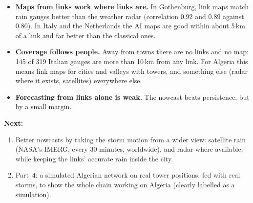 \begin{itemize}
\item \textbf{Maps from links work where links are.} In Gothenburg, link maps match rain gauges better than the weather
radar (correlation 0.92 and 0.89 against 0.80). In Italy and the Netherlands the AI maps are good within about 5\,km of a
link and far better than the classical ones.
\item \textbf{Coverage follows people.} Away from towns there are no links and no map: 145 of 319 Italian gauges are more
than 10\,km from any link. For Algeria this means link maps for cities and valleys with towers, and something else (radar
where it exists, satellites) everywhere else.
\item \textbf{Forecasting from links alone is weak.} The nowcast beats persistence, but by a small margin.
\end{itemize}

\textbf{Next:}
\begin{enumerate}
\item Better nowcasts by taking the storm motion from a wider view: satellite rain (NASA's IMERG, every 30 minutes,
worldwide), and radar where available, while keeping the links' accurate rain inside the city.
\item Part~4: a simulated Algerian network on real tower positions, fed with real storms, to show the whole chain working
on Algeria (clearly labelled as a simulation).
\end{enumerate}
